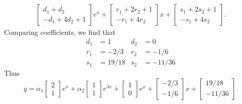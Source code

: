 \begin{soln}
\begin{align*}
        \begin{bmatrix} d_1+d_2 \\ -d_1+4d_2+1\end{bmatrix}e^x +\begin{bmatrix} r_1+2r_2+1 \\ -r_1+4r_2 \end{bmatrix}x+
        \begin{bmatrix} s_1+2s_2+1 \\ -s_1+4s_2 \end{bmatrix}.
    \end{align*}
    Comparing coefficients, we find that 
    \begin{align*}
        d_1 &= 1 &d_2 &= 0 \\
        r_1 &=-2/3 &r_2 &= -1/6 \\
        s_1 &= 19/18 &s_2 &= -11/36
    \end{align*}
    Thus $$\boxed{y=\alpha_1\begin{bmatrix} 2 \\ 1 \end{bmatrix}e^x + \alpha_2 \begin{bmatrix} 1 \\ 1 \end{bmatrix}e^{3x}
    +\begin{bmatrix} 1 \\ 0 \end{bmatrix} e^x + \begin{bmatrix} -2/3 \\ -1/6 \end{bmatrix}x
+\begin{bmatrix} 19/18 \\ -11/36 \end{bmatrix}}.$$
\end{soln}
 

